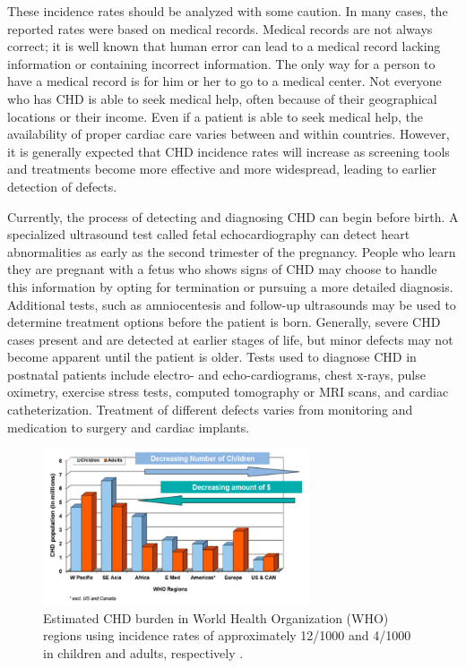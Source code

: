 These incidence rates should be analyzed with some caution. In many cases, the reported rates were based on medical records. Medical records are not always correct; it is well known that human error can lead to a medical record lacking information or containing incorrect information. The only way for a person to have a medical record is for him or her to go to a medical center. Not everyone who has CHD is able to seek medical help, often because of their geographical locations or their income. Even if a patient is able to seek medical help, the availability of proper cardiac care varies between and within countries. However, it is generally expected that CHD incidence rates will increase as screening tools and treatments become more effective and more widespread, leading to earlier detection of defects.
 
Currently, the process of detecting and diagnosing CHD can begin before birth. A specialized ultrasound test called fetal echocardiography can detect heart abnormalities as early as the second trimester of the pregnancy. People who learn they are pregnant with a fetus who shows signs of CHD may choose to handle this information by opting for termination or pursuing a more detailed diagnosis. Additional tests, such as amniocentesis and follow-up ultrasounds may be used to determine treatment options before the patient is born. Generally, severe CHD cases present and are detected at earlier stages of life, but minor defects may not become apparent until the patient is older. Tests used to diagnose CHD in postnatal patients include electro- and echo-cardiograms, chest x-rays, pulse oximetry, exercise stress tests, computed tomography or MRI scans, and cardiac catheterization. Treatment of different defects varies from monitoring and medication to surgery and cardiac implants.

\begin{figure}
\centering
\includegraphics[width=0.7\textwidth]{5/CHD-burden-webb.png}
\caption{Estimated CHD burden in World Health Organization (WHO) regions using incidence rates of approximately 12/1000 and 4/1000 in children and adults, respectively \cite{Webb2015}.}
\label{ch5:fig:CHD-burden}
\end{figure}

